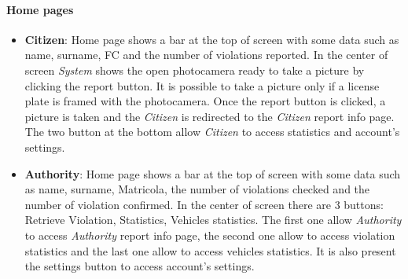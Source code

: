 \documentclass{article}
\begin{document}
\paragraph{Home pages}
\begin{itemize}
    \item \textbf{Citizen}: Home page shows a bar at the top of screen with some data such as name, surname, FC and 
    the number of violations reported. In the center of screen \textit{System} shows the open photocamera ready to take
    a picture by clicking the report button. It is possible to take a picture only if a license plate is framed with the 
    photocamera. Once the report button is clicked, a picture is taken and the \textit{Citizen} is redirected to the 
    \textit{Citizen} report info page. The two button at the bottom allow \textit{Citizen} to access statistics and 
    account's settings.

    \item \textbf{Authority}: Home page shows a bar at the top of screen with some data such as name, surname, Matricola,  
    the number of violations checked and the number of violation confirmed. In the center of screen there are 3 buttons:
    Retrieve Violation, Statistics, Vehicles statistics. The first one allow \textit{Authority} to access \textit{Authority} 
    report info page, the second one allow to access violation statistics and the last one allow to access vehicles 
    statistics. It is also present the settings button to access account's settings.  

\end{itemize}
\end{document}
